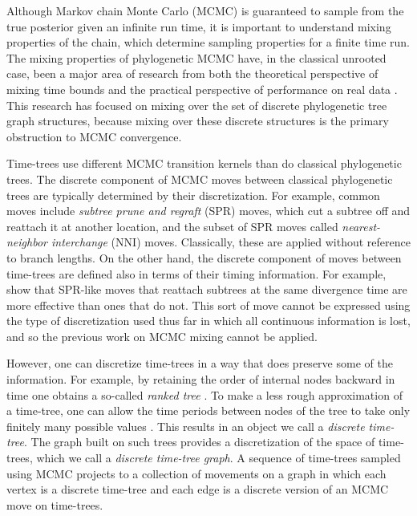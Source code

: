 \documentclass[11pt]{amsart}
\theoremstyle{definition}
\newcommand{\nni}{\mathrm{NNI}}
\begin{document}
Although Markov chain Monte Carlo (MCMC) is guaranteed to sample from the true posterior given an infinite run time, it is important to understand mixing properties of the chain, which determine sampling properties for a finite time run.
The mixing properties of phylogenetic MCMC have, in the classical unrooted case, been a major area of research from both the theoretical perspective of mixing time bounds \autocite{Mossel2005-ly,Mossel2006-fo,Stefankovic2011-hu,spade2014note} and the practical perspective of performance on real data \autocite{beiko2006searching,Ronquist2006-fv,lakner2008efficiency,Whidden2015-yi}.
This research has focused on mixing over the set of discrete phylogenetic tree graph structures, because mixing over these discrete structures is the primary obstruction to MCMC convergence.

Time-trees use different MCMC transition kernels than do classical phylogenetic trees.
The discrete component of MCMC moves between classical phylogenetic trees are typically determined by their discretization.
For example, common moves include \emph{subtree prune and regraft} (SPR) moves, which cut a subtree off and reattach it at another location, and the subset of SPR moves called \emph{nearest-neighbor interchange} ($\nni$) moves.
Classically, these are applied without reference to branch lengths.
On the other hand, the discrete component of moves between time-trees are defined also in terms of their timing information.
For example, \textcite{Hohna2008-vl} show that SPR-like moves that reattach subtrees at the same divergence time are more effective than ones that do not.
This sort of move cannot be expressed using the type of discretization used thus far in which all continuous information is lost, and so the previous work on MCMC mixing cannot be applied.

However, one can discretize time-trees in a way that does preserve some of the information.
For example, by retaining the order of internal nodes backward in time one obtains a so-called \emph{ranked tree} \autocite{Semple2003-nj}.
To make a less rough approximation of a time-tree, one can allow the time periods between nodes of the tree to take only finitely many possible values \autocite{Akerborg2008-cl}.
This results in an object we call a \emph{discrete time-tree}.
The graph built on such trees provides a discretization of the space of time-trees, which we call a \emph{discrete time-tree graph}.
A sequence of time-trees sampled using MCMC projects to a collection of movements on a graph in which each vertex is a discrete time-tree and each edge is a discrete version of an MCMC move on time-trees.
\end{document}
